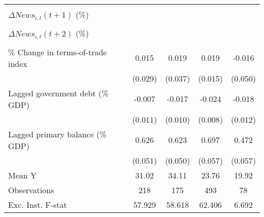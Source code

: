 {\begin{tabular}{l*{4}{c}}
                    &                     &                     &                     &                     \\
\addlinespace
$ \Delta News_{i,t}(t+1)$ (\%)&                     &                     &                     &                     \\
                    &                     &                     &                     &                     \\
\addlinespace
$ \Delta News_{i,t}(t+2)$ (\%)&                     &                     &                     &                     \\
                    &                     &                     &                     &                     \\
\addlinespace
\% Change in terms-of-trade index&       0.015         &       0.019         &       0.019         &      -0.016         \\
                    &     (0.029)         &     (0.037)         &     (0.015)         &     (0.050)         \\
\addlinespace
Lagged government debt (\% GDP)&      -0.007         &      -0.017\sym{*}  &      -0.024\sym{***}&      -0.018         \\
                    &     (0.011)         &     (0.010)         &     (0.008)         &     (0.012)         \\
\addlinespace
Lagged primary balance (\% GDP)&       0.626\sym{***}&       0.623\sym{***}&       0.697\sym{***}&       0.472\sym{***}\\
                    &     (0.051)         &     (0.050)         &     (0.057)         &     (0.057)         \\
\midrule
Mean Y              &       31.02         &       34.11         &       23.76         &       19.92         \\
Observations        &         218         &         175         &         493         &          78         \\
Exc. Inst. F-stat   &      57.929         &      58.618         &      62.406         &       6.692         \\
\bottomrule
\end{tabular}
}
